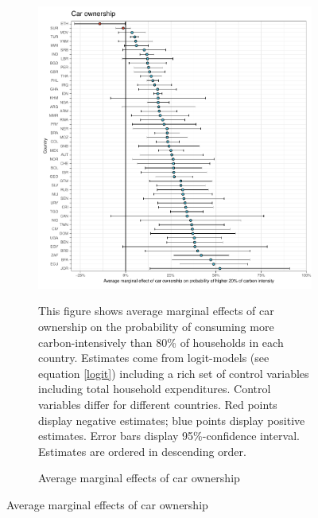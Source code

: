  \begin{figure}[ht!]\ContinuedFloat
   \centering
   \begin{subfigure}[b]{\textwidth}
   \centering
   \includegraphics{1_Figures/Analysis_Logit_Models_Marginal_Effects/Average_Marginal_Effects_affected_upper_80_car.01_2017B.pdf}
   \caption{Average marginal effects of car ownership} \label{fig:Logit_ME_car}
   \begin{subcaption2}
     This figure shows average marginal effects of car ownership on the probability of consuming more carbon-intensively than 80\% of households in each country. Estimates come from logit-models (see equation \ref{logit}) including a rich set of control variables including total household expenditures. Control variables differ for different countries. Red points display negative estimates; blue points display positive estimates. Error bars display 95\%-confidence interval. Estimates are ordered in descending order.
   \end{subcaption2}
   \end{subfigure}
 \end{figure}
 \clearpage

